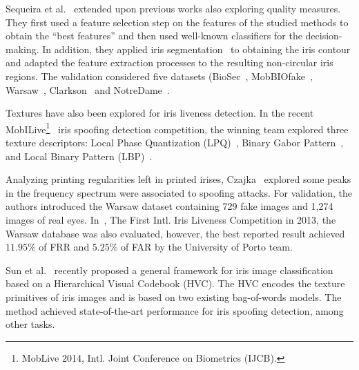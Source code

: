 Sequeira et al.~\cite{Sequeira:IJCNN:2014} extended upon previous works also exploring quality measures. They first used a feature selection step on the features of the studied methods to obtain the ``best features'' and then used well-known classifiers for the decision-making. In addition, they applied iris segmentation~\cite{Monteiro:CCIS:2014} to obtaining the iris contour and adapted the feature extraction processes to the resulting non-circular iris regions. The validation considered five datasets (BioSec~\cite{Fierrez-Aguilar:2007,Ruiz-Albacete:BIOID:2008}, MobBIOfake~\cite{Sequeira:VISAPP:2014:base}, Warsaw~\cite{Czajka:MMAR:2013}, Clarkson~\cite{LivDet:Iris:2013} and NotreDame~\cite{Doyle:2014:base}.

Textures have also been explored for iris liveness detection. In the recent MobILive\footnote{MobLive 2014, Intl. Joint Conference on Biometrics (IJCB).}~\cite{Sequeira:IJCB:2014} iris spoofing detection competition, the winning team explored three texture descriptors: Local Phase Quantization (LPQ)~\cite{Ojansivu:ISP:2008}, Binary Gabor Pattern~\cite{Zhang:ICIP:2012}, and Local Binary Pattern (LBP)~\cite{Ojala:TPAMI_2002}.

Analyzing printing regularities left in printed irises, Czajka~\cite{Czajka:MMAR:2013} explored some peaks in the frequency spectrum were associated to spoofing attacks. For validation, the authors introduced the Warsaw dataset containing 729 fake images and 1,274 images of real eyes. 
In~\cite{LivDet:Iris:2013}, The First Intl. Iris Liveness Competition in 2013, the Warsaw database was also evaluated, however, the best reported result achieved $11.95\%$ of FRR and $5.25\%$ of FAR by the University of Porto team.



Sun et al.~\cite{Sun:TPAMI:2014} recently proposed a general framework for iris image classification based on a Hierarchical Visual Codebook (HVC). The HVC encodes the texture primitives of iris images and is based on two existing bag-of-words models. The method achieved state-of-the-art performance for iris spoofing detection, among other tasks.

